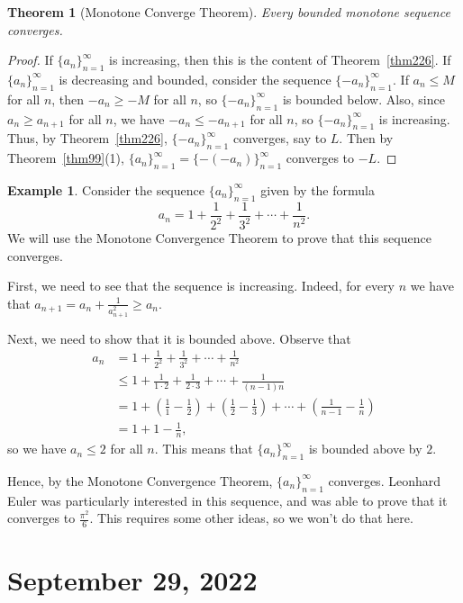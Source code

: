 \documentclass[12pt]{amsart}
\numberwithin{equation}{section}
\theoremstyle{plain} %
\newtheorem{thm}[equation]{Theorem}
\newcommand{\Sept}[1]{\section{September #1, 2022}}
\theoremstyle{definition}
\newtheorem{ex}[equation]{Example}
\theoremstyle{remark}
\begin{document}
\begin{thm}[Monotone Converge Theorem]\label{thm:MCT} Every bounded monotone sequence converges.
\end{thm}
\begin{proof}
If $\{a_n\}_{n=1}^\infty$ is increasing, then this is the content of Theorem~\ref{thm226}. If $\{a_n\}_{n=1}^\infty$ is decreasing and bounded, consider the sequence $\{-a_n\}_{n=1}^\infty$. If $a_n\leq M$ for all $n$, then $-a_n\geq -M$ for all $n$, so $\{-a_n\}_{n=1}^\infty$ is bounded below. Also, since $a_n \geq a_{n+1}$ for all $n$, we have $-a_n \leq -a_{n+1}$ for all $n$, so $\{-a_n\}_{n=1}^\infty$ is increasing. Thus, by Theorem~\ref{thm226}, $\{-a_n\}_{n=1}^\infty$ converges, say to $L$. Then by Theorem~\ref{thm99}(1), $\{a_n\}_{n=1}^\infty=\{-(-a_n)\}_{n=1}^\infty$ converges to $-L$.
\end{proof}

	

\begin{ex}
	Consider the sequence $\{a_n\}_{n=1}^\infty$ given by the formula
	\[ a_n = 1 + \frac{1}{2^2} + \frac{1}{3^2} + \cdots + \frac{1}{n^2}.\]
	We will use the Monotone Convergence Theorem to prove that this sequence converges.
	
	First, we need to see that the sequence is increasing. Indeed, for every $n$ we have that $a_{n+1} = a_n + \frac{1}{a_{n+1}^2} \geq a_n$.
	
	Next, we need to show that it is bounded above. Observe that
	\begin{align*} 
a_n &= 1 + \frac{1}{2^2} + \frac{1}{3^2} + \cdots + \frac{1}{n^2} \\
&\leq 1 + \frac{1}{1 \cdot 2} + \frac{1}{2 \cdot 3} + \cdots + \frac{1}{(n-1) n}\\
&= 1+ (\frac{1}{1} - \frac{1}{2}) + (\frac{1}{2} - \frac{1}{3})
 + \cdots +  (\frac{1}{n-1} - \frac{1}{n})\\
 &= 1 + 1 - \frac{1}{n},
		\end{align*}
		so we have $a_n \leq 2$ for all $n$. This means that $\{a_n\}_{n=1}^\infty$ is bounded above by $2$. 
		
		Hence, by the Monotone Convergence Theorem, $\{a_n\}_{n=1}^\infty$ converges. Leonhard Euler was particularly interested in this sequence, and was able to prove that it converges to $\frac{\pi^2}{6}$. This requires some other ideas, so we won't do that here.
	\end{ex}

\Sept{29}
\end{document}
